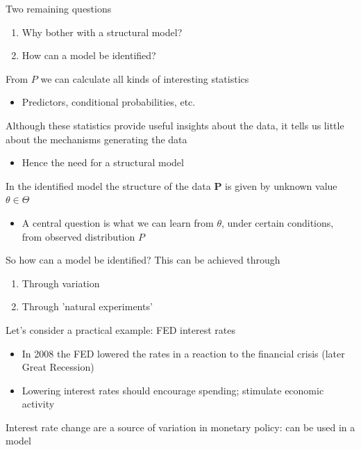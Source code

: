 \documentclass{beamer}
\begin{document}
\begin{frame}
  Two remaining questions
  \begin{enumerate}
    \item Why bother with a structural model?
    \item How can a model be identified?
  \end{enumerate}
\end{frame}

\begin{frame}
 From $P$ we can calculate all kinds of interesting statistics
 \begin{itemize}
   \item Predictors, conditional probabilities, etc.
 \end{itemize}
 \medskip
 Although these statistics provide useful insights about the data, it tells us little about the mechanisms generating the data
 \begin{itemize}
   \item Hence the need for a structural model
 \end{itemize}
 \medskip
 In the identified model the structure of the data $\mathbf{P}$ is given by unknown value $\theta \in \Theta$
 \begin{itemize}
   \item A central question is what we can learn from $\theta$, under certain conditions, from observed distribution $P$
 \end{itemize}
\end{frame}

\begin{frame}
 So how can a model be identified?
 This can be achieved through
 \begin{enumerate}
    \item Through variation
    \item Through 'natural experiments'
  \end{enumerate}
\end{frame}

\begin{frame}
 Let's consider a practical example: FED interest rates
 \begin{itemize}
   \item In 2008 the FED lowered the rates in a reaction to the financial crisis (later Great Recession)
   \item Lowering interest rates should encourage spending; stimulate economic activity
 \end{itemize}
 \medskip
 Interest rate change are a source of variation in monetary policy: can be used in a model  
\end{frame}
\end{document}
